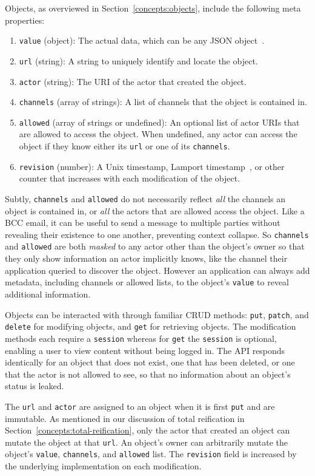 Objects, as overviewed in Section~\ref{concepts:objects}, include
the following meta properties:
\begin{enumerate}
\item
\texttt{value} (object): The actual data, which can be any JSON object~\cite{json}.
\item
\texttt{url} (string): A string to uniquely identify and locate the object.
\item
\texttt{actor} (string): The URI of the actor that created the object.
\item
\texttt{channels} (array of strings): A list of channels that the object is contained in.
\item
\texttt{allowed} (array of strings or undefined): An optional list of actor URIs that are allowed to access the object.
When undefined, any actor can access the object if they know either its \texttt{url} or one of its \texttt{channels}.
\item
\texttt{revision} (number): A Unix time\-stamp, Lamport time\-stamp~{\cite{lamport}}, or other counter that
increases with each modification of the object.
\end{enumerate}

Subtly, \texttt{channels} and \texttt{allowed} do not necessarily
reflect \emph{all} the channels an object is contained in, or
\emph{all} the actors that are allowed access the object.
Like a BCC email, it can be useful to send a message to multiple parties
without revealing their existence to one another, preventing
context collapse.
So \texttt{channels} and \texttt{allowed} are both \emph{masked} to any
actor other than the object's owner so that they only show information an actor implicitly knows,
like the channel their application queried to discover the object.
However an application can always
add metadata, including channels or allowed lists, to the object's \texttt{value}
to reveal additional information.

Objects can be interacted with through familiar CRUD methods:
\texttt{put}, \texttt{patch}, and \texttt{delete} for modifying objects,
and \texttt{get} for retrieving objects.
The modification methods each require a \texttt{session} whereas
for \texttt{get} the \texttt{session} is optional,
enabling a user to view content without being logged in.
The API responds identically for an object that does not exist,
one that has been deleted, or one that the actor is not allowed to see,
so that no information about an object's status is leaked.

The \texttt{url} and \texttt{actor} are assigned to an object when it is first \texttt{put}
and are immutable.
As mentioned in our discussion of total reification in Section~\ref{concepts:total-reification},
only the actor that created an object can mutate the object at that \texttt{url}.
An object's owner can arbitrarily mutate the object's
\texttt{value}, \texttt{channels}, and \texttt{allowed} list.
The \texttt{revision} field is increased by the underlying implementation on each modification.

